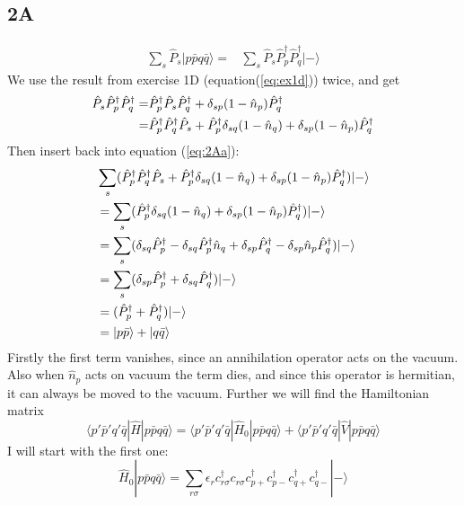 \documentclass[norsk,a4paper,12pt]{article}
\begin{document}
\subsection*{2A}
\begin{align}
\sum_s\hat{P}_s|p\bar{p}q\bar{q}\rangle=&\sum_s\hat{P}_s\hat{P}_p^{\dagger}\hat{P}_q^{\dagger}|-\rangle
\label{eq:2Aa}
\end{align}
We use the result from exercise 1D (equation(\ref{eq:ex1d})) twice, and get
\begin{align}
\hat{P}_s\hat{P}_p^{\dagger}\hat{P}_q^{\dagger}
=&\hat{P}_p^{\dagger}\hat{P}_s\hat{P}_q^{\dagger}+\delta_{sp}(1-\hat{n}_p)\hat{P}_q^{\dagger}\notag\\
=&\hat{P}_p^{\dagger}\hat{P}_q^{\dagger}\hat{P}_s+\hat{P}_p^{\dagger}\delta_{sq}(1-\hat{n}_q)+\delta_{sp}(1-\hat{n}_p)\hat{P}_q^{\dagger}
\end{align}
Then insert back into equation (\ref{eq:2Aa}):
\begin{align}
&\sum_s(\hat{P}_p^{\dagger}\hat{P}_q^{\dagger}\hat{P}_s+\hat{P}_p^{\dagger}\delta_{sq}(1-\hat{n}_q)+\delta_{sp}(1-\hat{n}_p)\hat{P}_q^{\dagger})|-\rangle\notag\\
&=\sum_s(\hat{P}_p^{\dagger}\delta_{sq}(1-\hat{n}_q)+\delta_{sp}(1-\hat{n}_p)\hat{P}_q^{\dagger})|-\rangle\notag\\
&=\sum_s(\delta_{sq}\hat{P}_p^{\dagger}-\delta_{sq}\hat{P}_p^{\dagger}\hat{n}_q+\delta_{sp}\hat{P}_q^{\dagger}-\delta_{sp}\hat{n}_p\hat{P}_q^{\dagger})|-\rangle\notag\\
&=\sum_s(\delta_{sp}\hat{P}_p^{\dagger}+\delta_{sq}\hat{P}_q^{\dagger})|-\rangle\notag\\
&=(\hat{P}_p^{\dagger}+\hat{P}_q^{\dagger})|-\rangle\notag\\
&=|p\bar{p}\rangle+|q\bar{q}\rangle
\end{align}
Firstly the first term vanishes, since an annihilation operator acts on the vacuum. Also when $\hat{n}_p$ acts on vacuum the term dies, and since this operator is hermitian, it can always be moved to the vacuum. Further we will find the Hamiltonian matrix
\begin{equation}
\langle p'\bar{p}'q'\bar{q}|\hat{H}|p\bar{p}q\bar{q}\rangle=\langle p'\bar{p}'q'\bar{q}|\hat{H}_0|p\bar{p}q\bar{q}\rangle+\langle p'\bar{p}'q'\bar{q}|\hat{V}|p\bar{p}q\bar{q}\rangle
\end{equation}
I will start with the first one:
\begin{equation}
\hat{H}_0|p\bar{p}q\bar{q}\rangle = \sum_{r\sigma}\epsilon_rc_{r\sigma}^{\dagger}c_{r\sigma}c_{p+}^{\dagger}c_{p-}^{\dagger}c_{q+}^{\dagger}c_{q-}^{\dagger}|-\rangle
\end{equation}
\end{document}
